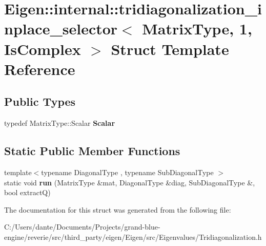 \hypertarget{struct_eigen_1_1internal_1_1tridiagonalization__inplace__selector_3_01_matrix_type_00_011_00_01_is_complex_01_4}{}\section{Eigen\+::internal\+::tridiagonalization\+\_\+inplace\+\_\+selector$<$ Matrix\+Type, 1, Is\+Complex $>$ Struct Template Reference}
\label{struct_eigen_1_1internal_1_1tridiagonalization__inplace__selector_3_01_matrix_type_00_011_00_01_is_complex_01_4}
\subsection*{Public Types}
\begin{DoxyCompactItemize}
\item 
\mbox{\label{struct_eigen_1_1internal_1_1tridiagonalization__inplace__selector_3_01_matrix_type_00_011_00_01_is_complex_01_4_a553cc701f0e55f0de7408d4ea093a7b4}} 
typedef Matrix\+Type\+::\+Scalar {\bfseries Scalar}
\end{DoxyCompactItemize}
\subsection*{Static Public Member Functions}
\begin{DoxyCompactItemize}
\item 
\mbox{\label{struct_eigen_1_1internal_1_1tridiagonalization__inplace__selector_3_01_matrix_type_00_011_00_01_is_complex_01_4_a8f0ab18cd3097414183e709cc22fb20e}} 
{\footnotesize template$<$typename Diagonal\+Type , typename Sub\+Diagonal\+Type $>$ }\\static void {\bfseries run} (Matrix\+Type \&mat, Diagonal\+Type \&diag, Sub\+Diagonal\+Type \&, bool extractQ)
\end{DoxyCompactItemize}


The documentation for this struct was generated from the following file\+:\begin{DoxyCompactItemize}
\item 
C\+:/\+Users/dante/\+Documents/\+Projects/grand-\/blue-\/engine/reverie/src/third\+\_\+party/eigen/\+Eigen/src/\+Eigenvalues/Tridiagonalization.\+h\end{DoxyCompactItemize}
